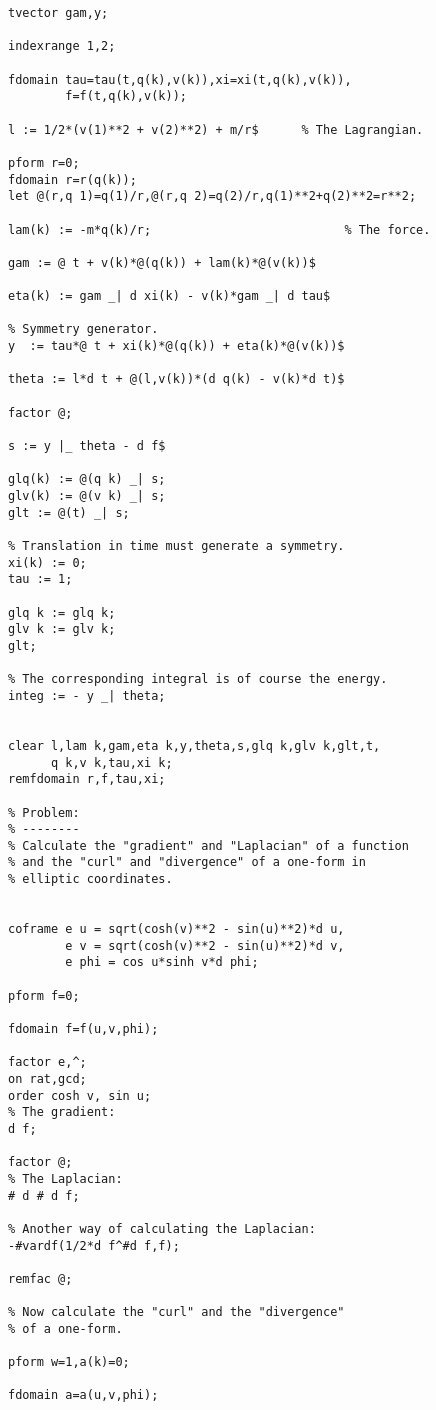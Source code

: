 {\begin{verbatim}
tvector gam,y;

indexrange 1,2;

fdomain tau=tau(t,q(k),v(k)),xi=xi(t,q(k),v(k)),
        f=f(t,q(k),v(k));

l := 1/2*(v(1)**2 + v(2)**2) + m/r$      % The Lagrangian.

pform r=0;
fdomain r=r(q(k));
let @(r,q 1)=q(1)/r,@(r,q 2)=q(2)/r,q(1)**2+q(2)**2=r**2;

lam(k) := -m*q(k)/r;                           % The force.

gam := @ t + v(k)*@(q(k)) + lam(k)*@(v(k))$

eta(k) := gam _| d xi(k) - v(k)*gam _| d tau$

% Symmetry generator.
y  := tau*@ t + xi(k)*@(q(k)) + eta(k)*@(v(k))$

theta := l*d t + @(l,v(k))*(d q(k) - v(k)*d t)$

factor @;

s := y |_ theta - d f$

glq(k) := @(q k) _| s;
glv(k) := @(v k) _| s;
glt := @(t) _| s;

% Translation in time must generate a symmetry.
xi(k) := 0;
tau := 1;

glq k := glq k;
glv k := glv k;
glt;

% The corresponding integral is of course the energy.
integ := - y _| theta;


clear l,lam k,gam,eta k,y,theta,s,glq k,glv k,glt,t,
      q k,v k,tau,xi k;
remfdomain r,f,tau,xi;

% Problem:
% --------
% Calculate the "gradient" and "Laplacian" of a function
% and the "curl" and "divergence" of a one-form in
% elliptic coordinates.


coframe e u = sqrt(cosh(v)**2 - sin(u)**2)*d u,
        e v = sqrt(cosh(v)**2 - sin(u)**2)*d v,
        e phi = cos u*sinh v*d phi;

pform f=0;

fdomain f=f(u,v,phi);

factor e,^;
on rat,gcd;
order cosh v, sin u;
% The gradient:
d f;

factor @;
% The Laplacian:
# d # d f;

% Another way of calculating the Laplacian:
-#vardf(1/2*d f^#d f,f);

remfac @;

% Now calculate the "curl" and the "divergence"
% of a one-form.

pform w=1,a(k)=0;

fdomain a=a(u,v,phi);


\end{verbatim}}
